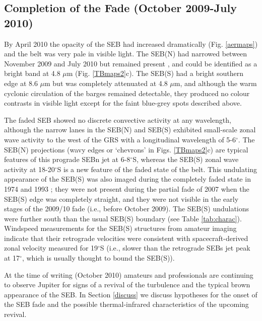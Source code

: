 \documentclass[final,5p,times,twocolumn,authoryear]{elsarticle}
\newcommand{\degree}{\ensuremath{^\circ}}
\begin{document}
\subsection{Completion of the Fade (October 2009-July 2010)}
%
By April 2010 the opacity of the SEB had increased dramatically (Fig. \ref{aermaps}) and the belt was very pale in visible light.  The SEB(N) had narrowed between November 2009 and July 2010 but remained present \citep[similar to the faded state of 1992,][]{96sanchez_SEB}, and could be identified as a bright band at 4.8 $\mu$m (Fig. \ref{TBmaps2}c).  The SEB(S) had a bright southern edge at 8.6 $\mu$m but was completely attenuated at 4.8 $\mu$m, and although the warm cyclonic circulation of the barges remained detectable, they produced no colour contrasts in visible light except for the faint blue-grey spots described above.

The faded SEB showed no discrete convective activity at any wavelength, although the narrow lanes in the SEB(N) and SEB(S) exhibited small-scale zonal wave activity to the west of the GRS with a longitudinal wavelength of 5-6\degree.  The SEB(N) projections (wavy edges or `chevrons' in Figs. \ref{TBmaps2}c) are typical features of this prograde SEBn jet at 6-8$^\circ$S, whereas the SEB(S) zonal wave activity at 18-20$^\circ$S is a new feature of the faded state of the belt.  This undulating appearance of the SEB(S) was also imaged during the completely faded state in 1974 \citep[Pioneer-11 images,][]{77rogers} and 1993 \citep{96sanchez_SEB}; they were not present during the partial fade of 2007 when the SEB(S) edge was completely straight, and they were not visible in the early stages of the 2009/10 fade (i.e., before October 2009).    The SEB(S) undulations were further south than the usual SEB(S) boundary (see Table \ref{tab:charac}).  Windspeed measurements for the SEB(S) structures from amateur imaging \citep{10rogers_spots} indicate that their retrograde velocities were consistent with spacecraft-derived zonal velocity measured for 19$^\circ$S (i.e., slower than the retrograde SEBs jet peak at 17$^\circ$, which is usually thought to bound the SEB(S)).   

At the time of writing (October 2010) amateurs and professionals are continuing to observe Jupiter for signs of a revival of the turbulence and the typical brown appearance of the SEB.  In Section \ref{discuss} we discuss hypotheses for the onset of the SEB fade and the possible thermal-infrared characteristics of the upcoming revival.
\end{document}
